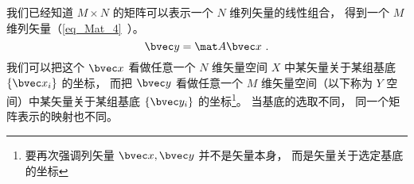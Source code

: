 


我们已经知道 $M\times N$ 的矩阵可以表示一个 $N$ 维列矢量的线性组合， 得到一个 $M$ 维列矢量（\autoref{eq_Mat_4}~）。
\begin{equation}\label{eq_MatLS_1}
\bvec y = \mat A \bvec x~.
\end{equation}
我们可以把这个 $\bvec x$ 看做任意一个 $N$ 维矢量空间 $X$ 中某矢量关于某组基底 $\{\bvec x_i\}$ 的坐标， 而把 $\bvec y$ 看做任意一个 $M$ 维矢量空间（以下称为 $Y$ 空间）中某矢量关于某组基底 $\{\bvec y_i\}$ 的坐标\footnote{要再次强调列矢量 $\bvec x, \bvec y$ 并不是矢量本身， 而是矢量关于选定基底的坐标}。 当基底的选取不同， 同一个矩阵表示的映射也不同。

